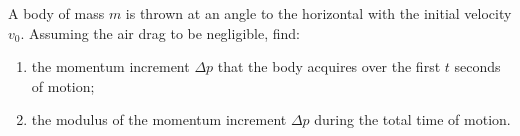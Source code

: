 \item A body of mass \( m \) is thrown at an angle to the horizontal with the initial velocity \( v_0 \). Assuming the air drag to be negligible, find:
    \begin{enumerate}
        \item the momentum increment \( \Delta p \) that the body acquires over the first \( t \) seconds of motion;
        \item the modulus of the momentum increment \( \Delta p \) during the total time of motion.
    \end{enumerate}